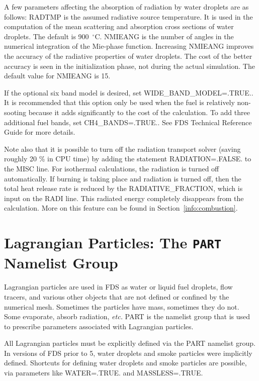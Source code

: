 \documentclass[11pt]{book}
\begin{document}
A few parameters affecting the absorption of radiation by water
droplets are as follows: {\ct RADTMP} is the assumed radiative source temperature.
It is used in the computation of the mean scattering
and absorption cross sections of water droplets. The default is 900~$^\circ$C.
{\ct NMIEANG} is the number of angles in the numerical integration of the Mie-phase function.
Increasing {\ct NMIEANG} improves the accuracy
of the radiative properties of water droplets. The cost
of the better accuracy is seen in the initialization phase,
not during the actual simulation. The default value for {\ct NMIEANG}
is 15.

If the optional six band model is desired,
set {\ct WIDE\_BAND\_MODEL=.TRUE.}. It is recommended that this option
only be used when the fuel is relatively non-sooting because it
adds significantly to the cost of the calculation. To add three
additional fuel bands, set {\ct CH4\_BANDS=.TRUE.}. See FDS Technical
Reference Guide for more details.

Note also that it is possible to turn off the radiation transport
solver (saving roughly 20 \% in CPU time) by adding the statement
{\ct RADIATION=.FALSE.} to the {\ct MISC} line. For isothermal
calculations, the radiation is turned off automatically. If burning
is taking place and radiation is turned off, then the total heat
release rate is reduced by the {\ct RADIATIVE\_FRACTION}, which is
input on the {\ct RADI} line. This radiated energy completely
disappears from the calculation. More on this feature can be found in
Section~\ref{info:combustion}.






\clearpage

\chapter{Lagrangian Particles: The \texorpdfstring{{\tt PART}}{PART} Namelist Group}
\label{info:PART}

Lagrangian particles are used in FDS as water or liquid fuel
droplets, flow tracers, and various other objects that are not defined or confined by the numerical mesh. Sometimes the
particles have mass, sometimes they do not. Some evaporate,
absorb radiation, {\em etc.}
{\ct PART} is the namelist group that is used to prescribe
parameters associated with Lagrangian particles.

\begin{warning}
All Lagrangian particles must be explicitly defined via the {\ct PART} namelist group. In versions of FDS prior to 5, water droplets and
smoke particles were implicitly defined. Shortcuts for defining water droplets and smoke particles are possible, via parameters like
{\ct WATER=.TRUE.} and {\ct MASSLESS=.TRUE.}
\end{warning}
\end{document}

